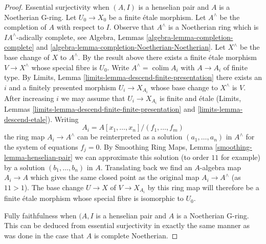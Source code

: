 \documentclass{stacks-project}
\theoremstyle{plain}
\theoremstyle{definition}
\theoremstyle{remark}
\numberwithin{equation}{subsection}
\def\colim{\mathop{\mathrm{colim}}\nolimits}
\begin{document}
\begin{proof}
\medskip\noindent
Essential surjectivity when $(A, I)$ is a henselian pair
and $A$ is a Noetherian G-ring.
Let $U_0 \to X_0$ be a finite \'etale morphism.
Let $A^\wedge$ be the completion of $A$ with respect to $I$.
Observe that $A^\wedge$ is a Noetherian ring which is
$IA^\wedge$-adically complete, see Algebra, Lemmas
\ref{algebra-lemma-completion-complete} and
\ref{algebra-lemma-completion-Noetherian-Noetherian}.
Let $X^\wedge$ be the base change of $X$ to $A^\wedge$.
By the result above there exists a finite \'etale morphism
$V \to X^\wedge$ whose special fibre is $U_0$.
Write $A^\wedge = \colim A_i$ with $A \to A_i$ of finite type.
By Limits, Lemma \ref{limits-lemma-descend-finite-presentation}
there exists an $i$ and a finitely presented morphism $U_i \to X_{A_i}$
whose base change to $X^\wedge$ is $V$. After increasing $i$
we may assume that $U_i \to X_{A_i}$ is finite and \'etale
(Limits, Lemmas \ref{limits-lemma-descend-finite-finite-presentation} and
\ref{limits-lemma-descend-etale}). Writing
$$
A_i = A[x_1, \ldots, x_n]/(f_1, \ldots, f_m)
$$
the ring map $A_i \to A^\wedge$ can be reinterpreted as a solution
$(a_1, \ldots, a_n)$ in $A^\wedge$ for the system of equations $f_j = 0$.
By Smoothing Ring Maps, Lemma \ref{smoothing-lemma-henselian-pair}
we can approximate this solution (to order $11$ for example) by a solution
$(b_1, \ldots, b_n)$ in $A$. Translating back we find an $A$-algebra map
$A_i \to A$ which gives the same closed point as the original map
$A_i \to A^\wedge$ (as $11 > 1$). The base change $U \to X$ of $V \to X_{A_i}$
by this ring map will therefore be a finite \'etale morphism whose
special fibre is isomorphic to $U_0$.

\medskip\noindent
Fully faithfulness when $(A, I$ is a henselian pair and $A$ is a Noetherian
G-ring. This can be deduced from essential surjectivity in exactly the same
manner as was done in the case that $A$ is complete Noetherian.


\end{proof}
\end{document}
